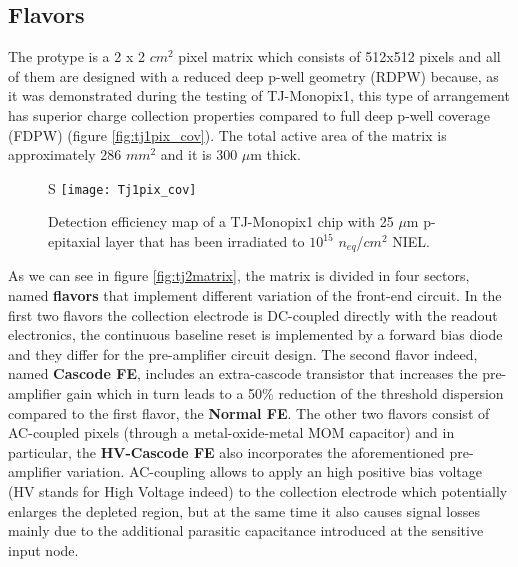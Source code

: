 
\subsection{Flavors} \label{flavors}

The protype is a 2 x 2 $cm^{2}$ pixel matrix which consists of 512x512 pixels and all of them are designed with a reduced deep p-well geometry (RDPW) because, as it was demonstrated during the testing of TJ-Monopix1, this type of arrangement has superior charge collection properties compared to full deep p-well coverage (FDPW) (figure \vref{fig:tj1pix_cov}). The total active area of the matrix is approximately 286 $mm^{2}$ and it is 300 $\mu$m thick.



\begin{figure}[h!]S
\centering
\texttt{[image: Tj1pix\_cov]}
\caption{Detection efficiency map of a TJ-Monopix1 chip with 25 $\mu$m p-epitaxial layer that has been irradiated to $10^{15}$ $n_{\textit{eq}}$/$cm^{2}$ NIEL.}
\label{fig:tj1pix_cov}
\end{figure}

As we can see in figure \vref{fig:tj2matrix}, the matrix is divided in four sectors, named \textbf{flavors} that implement different variation of the front-end circuit. In the first two flavors the collection electrode is DC-coupled directly with the readout electronics,  the continuous baseline reset is implemented by a forward bias diode and they differ for the pre-amplifier circuit design. The second flavor indeed, named \textbf{Cascode FE}, includes an extra-cascode transistor that increases the pre-amplifier gain which in turn leads to a 50\% reduction of the threshold dispersion compared to the first flavor, the \textbf{Normal FE}. The other two flavors consist of AC-coupled pixels (through a metal-oxide-metal MOM capacitor) and in particular, the \textbf{HV-Cascode FE} also incorporates the aforementioned pre-amplifier variation. AC-coupling allows to apply an high positive bias voltage (HV stands for High Voltage indeed) to the collection electrode which potentially enlarges the depleted region, but at the same time it also causes signal losses mainly due to the additional parasitic capacitance introduced at the sensitive input node.\\




